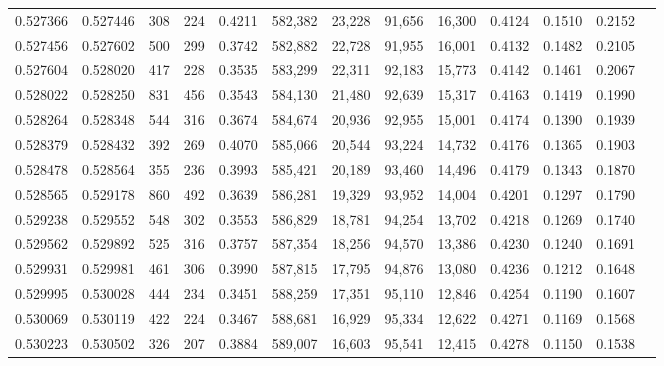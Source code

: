 \begin{tabular}{rrrrrrrrrrrrr}
0.527366 & 0.527446 &   308 &   224 &                                     0.4211 & 582,382 &  23,228 &  91,656 &  16,300 & 0.4124 & 0.1510 & 0.2152 \\
0.527456 & 0.527602 &   500 &   299 &                                     0.3742 & 582,882 &  22,728 &  91,955 &  16,001 & 0.4132 & 0.1482 & 0.2105 \\
0.527604 & 0.528020 &   417 &   228 &                                     0.3535 & 583,299 &  22,311 &  92,183 &  15,773 & 0.4142 & 0.1461 & 0.2067 \\
0.528022 & 0.528250 &   831 &   456 &                                     0.3543 & 584,130 &  21,480 &  92,639 &  15,317 & 0.4163 & 0.1419 & 0.1990 \\
0.528264 & 0.528348 &   544 &   316 &                                     0.3674 & 584,674 &  20,936 &  92,955 &  15,001 & 0.4174 & 0.1390 & 0.1939 \\
0.528379 & 0.528432 &   392 &   269 &                                     0.4070 & 585,066 &  20,544 &  93,224 &  14,732 & 0.4176 & 0.1365 & 0.1903 \\
0.528478 & 0.528564 &   355 &   236 &                                     0.3993 & 585,421 &  20,189 &  93,460 &  14,496 & 0.4179 & 0.1343 & 0.1870 \\
0.528565 & 0.529178 &   860 &   492 &                                     0.3639 & 586,281 &  19,329 &  93,952 &  14,004 & 0.4201 & 0.1297 & 0.1790 \\
0.529238 & 0.529552 &   548 &   302 &                                     0.3553 & 586,829 &  18,781 &  94,254 &  13,702 & 0.4218 & 0.1269 & 0.1740 \\
0.529562 & 0.529892 &   525 &   316 &                                     0.3757 & 587,354 &  18,256 &  94,570 &  13,386 & 0.4230 & 0.1240 & 0.1691 \\
0.529931 & 0.529981 &   461 &   306 &                                     0.3990 & 587,815 &  17,795 &  94,876 &  13,080 & 0.4236 & 0.1212 & 0.1648 \\
0.529995 & 0.530028 &   444 &   234 &                                     0.3451 & 588,259 &  17,351 &  95,110 &  12,846 & 0.4254 & 0.1190 & 0.1607 \\
0.530069 & 0.530119 &   422 &   224 &                                     0.3467 & 588,681 &  16,929 &  95,334 &  12,622 & 0.4271 & 0.1169 & 0.1568 \\
0.530223 & 0.530502 &   326 &   207 &                                     0.3884 & 589,007 &  16,603 &  95,541 &  12,415 & 0.4278 & 0.1150 & 0.1538 \\

\end{tabular}
